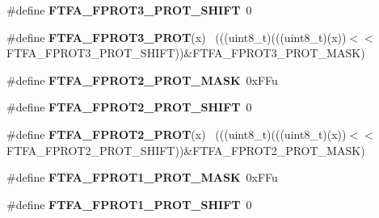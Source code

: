 \begin{DoxyCompactItemize}
\item 
\hypertarget{group___f_t_f_a___register___masks_ga35d09e54593dc5d05e0946e9ca3ae42b}{}\#define {\bfseries F\+T\+F\+A\+\_\+\+F\+P\+R\+O\+T3\+\_\+\+P\+R\+O\+T\+\_\+\+S\+H\+I\+F\+T}~0\label{group___f_t_f_a___register___masks_ga35d09e54593dc5d05e0946e9ca3ae42b}

\item 
\hypertarget{group___f_t_f_a___register___masks_ga0cc70ceab9f611ea3623e28d8526a9f4}{}\#define {\bfseries F\+T\+F\+A\+\_\+\+F\+P\+R\+O\+T3\+\_\+\+P\+R\+O\+T}(x)                                        ~(((uint8\+\_\+t)(((uint8\+\_\+t)(x))$<$$<$F\+T\+F\+A\+\_\+\+F\+P\+R\+O\+T3\+\_\+\+P\+R\+O\+T\+\_\+\+S\+H\+I\+F\+T))\&F\+T\+F\+A\+\_\+\+F\+P\+R\+O\+T3\+\_\+\+P\+R\+O\+T\+\_\+\+M\+A\+S\+K)\label{group___f_t_f_a___register___masks_ga0cc70ceab9f611ea3623e28d8526a9f4}

\item 
\hypertarget{group___f_t_f_a___register___masks_ga17b0f04e6c61b3683a99ef21674d8329}{}\#define {\bfseries F\+T\+F\+A\+\_\+\+F\+P\+R\+O\+T2\+\_\+\+P\+R\+O\+T\+\_\+\+M\+A\+S\+K}~0x\+F\+Fu\label{group___f_t_f_a___register___masks_ga17b0f04e6c61b3683a99ef21674d8329}

\item 
\hypertarget{group___f_t_f_a___register___masks_ga7c2381deecb19163451591155ba5a05e}{}\#define {\bfseries F\+T\+F\+A\+\_\+\+F\+P\+R\+O\+T2\+\_\+\+P\+R\+O\+T\+\_\+\+S\+H\+I\+F\+T}~0\label{group___f_t_f_a___register___masks_ga7c2381deecb19163451591155ba5a05e}

\item 
\hypertarget{group___f_t_f_a___register___masks_ga18c11264564d827c13ac8c2587757f3c}{}\#define {\bfseries F\+T\+F\+A\+\_\+\+F\+P\+R\+O\+T2\+\_\+\+P\+R\+O\+T}(x)                                        ~(((uint8\+\_\+t)(((uint8\+\_\+t)(x))$<$$<$F\+T\+F\+A\+\_\+\+F\+P\+R\+O\+T2\+\_\+\+P\+R\+O\+T\+\_\+\+S\+H\+I\+F\+T))\&F\+T\+F\+A\+\_\+\+F\+P\+R\+O\+T2\+\_\+\+P\+R\+O\+T\+\_\+\+M\+A\+S\+K)\label{group___f_t_f_a___register___masks_ga18c11264564d827c13ac8c2587757f3c}

\item 
\hypertarget{group___f_t_f_a___register___masks_gaffbe916c9df3b3d7f04288d9d9746c50}{}\#define {\bfseries F\+T\+F\+A\+\_\+\+F\+P\+R\+O\+T1\+\_\+\+P\+R\+O\+T\+\_\+\+M\+A\+S\+K}~0x\+F\+Fu\label{group___f_t_f_a___register___masks_gaffbe916c9df3b3d7f04288d9d9746c50}

\item 
\hypertarget{group___f_t_f_a___register___masks_ga1b5389e270a3438c9501d785ac868461}{}\#define {\bfseries F\+T\+F\+A\+\_\+\+F\+P\+R\+O\+T1\+\_\+\+P\+R\+O\+T\+\_\+\+S\+H\+I\+F\+T}~0\label{group___f_t_f_a___register___masks_ga1b5389e270a3438c9501d785ac868461}


\end{DoxyCompactItemize}
